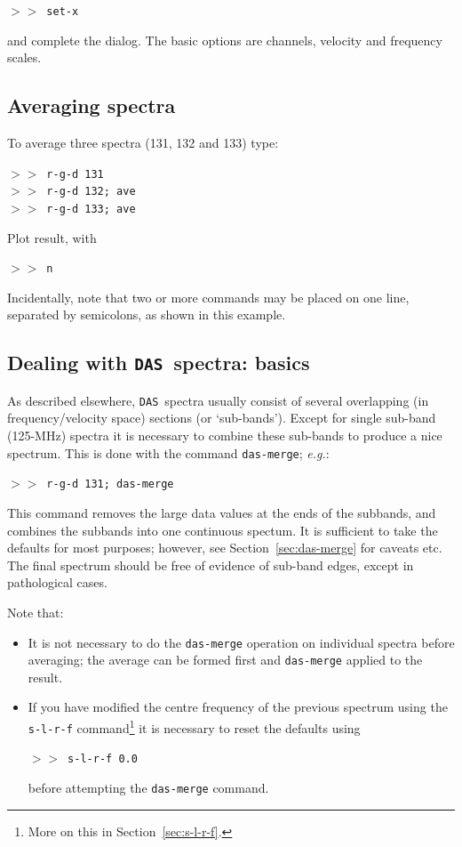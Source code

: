 \documentclass[11pt,twoside]{starlink}
\providecommand{\eg}{\textit{e.g.}}
\providecommand{\SPECX}{\texttt{SPECX}}
\providecommand{\das}{\texttt{DAS}}
\providecommand{\margnote}[1]
{\marginpar{({\it{\ref{#1}}})}}
\providecommand{\SP}{{$>\!>$}}
\begin{document}
\SP\ {\tt{set-x}}

and complete the dialog. The basic options are channels, velocity and
frequency scales.


\subsection{Averaging spectra}
To average\margnote{sec:specx_8.2} three spectra (131, 132 and 133) type:

\SP\ {\tt{r-g-d 131}}\\
\SP\ {\tt{r-g-d 132; ave}}\\
\SP\ {\tt{r-g-d 133; ave}}

Plot result, with

\SP\ {\tt{n}}

Incidentally, note that two or more commands may be placed on one
line, separated by semicolons, as shown in this example.

\subsection{Dealing with \das\ spectra: basics}
\label{sec:subbands}
As described elsewhere,
\das\ spectra usually
\margnote{sec:das-merge}
consist of several overlapping (in frequency/velocity space) sections
(or `sub-bands'). Except for single sub-band (125-MHz) spectra it is
necessary to combine these sub-bands to produce a nice spectrum. This
is done with the command {\tt{das-merge}}; \eg :

\SP\ \texttt{r-g-d 131; das-merge}

This command removes the large data values at the ends
of the subbands, and combines the subbands into one continuous
spectum.  It is sufficient to take the defaults for most purposes;
however, see Section~\ref{sec:das-merge} for caveats etc.  The final
spectrum should be free of evidence of sub-band edges, except in
pathological cases.


\reversemarginpar
Note that:
\begin{itemize}
\item
It is not necessary to do the \texttt{das-merge} operation on individual
spectra before averaging; the average can be formed first and
{\tt{das-merge}} applied to the result.
\item
If you have modified the centre frequency of the previous spectrum
\margnote{sec:s-l-r-f}
using the {\tt{s-l-r-f}} command\footnote{More on this in
Section~\ref{sec:s-l-r-f}.} it is necessary to reset the defaults
using

\SP\ {\tt{s-l-r-f 0.0}}

before attempting the {\tt{das-merge}} command.
\end{itemize}
\end{document}
